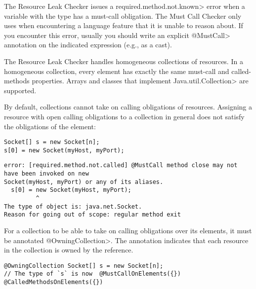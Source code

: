 The Resource Leak Checker issues a \<required.method.not.known> error
when a variable with the type \MustCallUnknown has a must-call obligation.
The Must Call Checker
only uses \MustCallUnknown when encountering a language
feature that it is unable to reason about.
If you encounter this error, usually you should write an explicit \<@MustCall> annotation
on the indicated expression (e.g., as a cast).

\pagebreak


The Resource Leak Checker handles homogeneous collections of resources. In a homogeneous collection, every element
has exactly the same must-call and called-methods properties. Arrays and classes that implement \<Java.util.Collection> are supported.


By default, collections cannot take on calling obligations of resources. Assigning a resource with open calling obligations to a collection in general does not satisfy the obligations of the element:

\begin{verbatim}
Socket[] s = new Socket[n];
s[0] = new Socket(myHost, myPort);
\end{verbatim}

\begin{verbatim}
error: [required.method.not.called] @MustCall method close may not have been invoked on new
Socket(myHost, myPort) or any of its aliases.
  s[0] = new Socket(myHost, myPort);
         ^
The type of object is: java.net.Socket.
Reason for going out of scope: regular method exit
\end{verbatim}

For a collection to be able to take on calling obligations over its elements, it must be annotated \<@OwningCollection>. The annotation indicates that each resource in the collection is owned by the reference.

\begin{Verbatim}
@OwningCollection Socket[] s = new Socket[n];
// The type of `s` is now  @MustCallOnElements({}) @CalledMethodsOnElements({})
\end{Verbatim}

